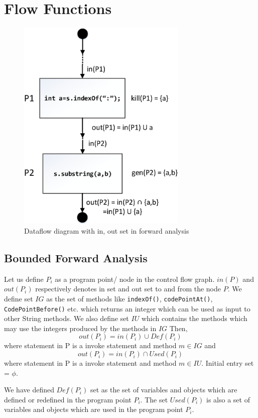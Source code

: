 \section{Flow Functions}
\label{sec:flowFunctions}

\begin{figure}[f]
\centering
\includegraphics[width=3.2in]{images/dataflow.png}
\caption{Dataflow diagram with in, out set in forward analysis}
\label{fig:dataflow}
\end{figure}

\subsection{Bounded Forward Analysis}
\label{subsec:boundedForward}

Let us define $P_i$ as a program point/ node in the control flow graph. $in(P)$
and $out(P_i)$ respectively denotes in set and out set to and from the node $P$.
We define set $IG$ as the set of methods like \texttt{indexOf()},
\texttt{codePointAt()}, \texttt{CodePointBefore()} etc. which returns an integer
which can be used as input to other String methods. We also define set $IU$
which contains the methods which may use the integers produced by the methods in
$IG$ Then, 
$$out(P_i) = in(P_i) \cup Def(P_i)$$ where statement in P is a invoke statement
and method $m \in IG$ and
$$out(P_i) = in(P_i) \cap Used(P_i)$$ where statement in P is a invoke statement
and method $m \in IU$. Initial entry set = ${\phi}$.


We have defined $Def(P_i)$ set as the set of variables and objects which are
defined or redefined in the program point $P_i$. The set $Used(P_i)$ is also a
set of variables and objects which are used in the program point $P_i$.

